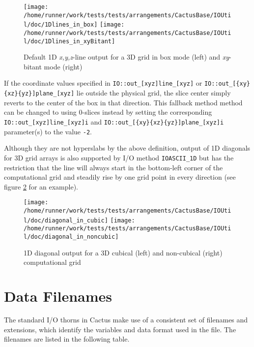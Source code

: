 \documentclass{article}
\begin{document}
\begin{figure}[ht]
\begin{center}
\texttt{[image: /home/runner/work/tests/tests/arrangements/CactusBase/IOUtil/doc/1Dlines\_in\_box]}
\texttt{[image: /home/runner/work/tests/tests/arrangements/CactusBase/IOUtil/doc/1Dlines\_in\_xyBitant]}
\end{center}
\caption{Default 1D {\it x,y,z}-line output for a 3D grid in box mode (left) and {\it xy}-bitant mode (right)}
\label{default_1D_output}
\end{figure}

If the coordinate values specified in {\tt IO::out\_[xyz]line\_[xyz]}
or {\tt IO::out\_[\{xy\}\{xz\}\{yz\}]plane\_[xyz]} lie outside the physical
grid, the slice center simply reverts to the center of the box in that
direction. This fallback method method can be changed to using 0-slices instead
by setting the corresponding {\tt IO::out\_[xyz]line\_[xyz]i}
and {\tt IO::out\_[\{xy\}\{xz\}\{yz\}]plane\_[xyz]i} parameter(s) to the value
{\tt -2}.

Although they are not hyperslabs by the above definition, output of 1D diagonals
for 3D grid arrays is also supported by I/O method {\tt IOASCII\_1D} but has the
restriction that the line will always start in the bottom-left corner of the
computational grid and steadily rise by one grid point in every direction (see
figure \ref{default_diagonal_output} for an example).

\begin{figure}[ht]
\begin{center}
\texttt{[image: /home/runner/work/tests/tests/arrangements/CactusBase/IOUtil/doc/diagonal\_in\_cubic]}
\texttt{[image: /home/runner/work/tests/tests/arrangements/CactusBase/IOUtil/doc/diagonal\_in\_noncubic]}
\end{center}
\caption{1D diagonal output for a 3D cubical (left) and non-cubical (right)
computational grid}
\label{default_diagonal_output}
\end{figure}


\section{Data Filenames}

The standard I/O thorns in Cactus make use of a consistent set of filenames
and extensions, which identify the variables and data format used in the file.
The filenames are listed in the following table.
\end{document}
